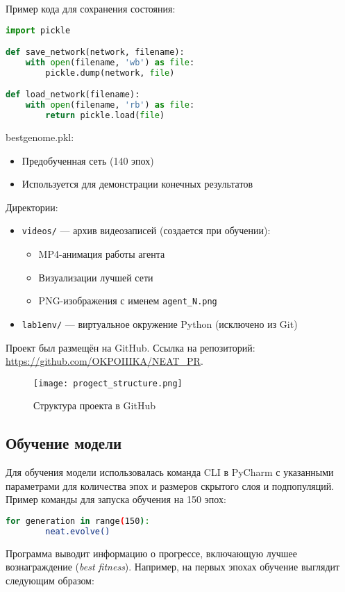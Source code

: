 \documentclass[a4paper,12pt]{article}
\begin{document}
Пример кода для сохранения состояния:

\begin{lstlisting}[language=Python]
import pickle

def save_network(network, filename):
    with open(filename, 'wb') as file:
        pickle.dump(network, file)

def load_network(filename):
    with open(filename, 'rb') as file:
        return pickle.load(file)
\end{lstlisting}	
	bestgenome.pkl:
	\begin{itemize}
		\item Предобученная сеть (140 эпох)
		\item Используется для демонстрации конечных результатов
	\end{itemize}
	
	Директории:
	\begin{itemize}
		\item \texttt{videos/} --- архив видеозаписей (создается при обучении):
		\begin{itemize}
			\item MP4-анимация работы агента

		\end{itemize}
		\begin{itemize}
			\item Визуализации лучшей сети
			\item PNG-изображения с именем \texttt{agent\_N.png}
		\end{itemize}
		\item \texttt{lab1env/} --- виртуальное окружение Python (исключено из Git)
	\end{itemize}

Проект был размещён на GitHub.   
Ссылка на репозиторий: \url{https://github.com/OKPOIIIKA/NEAT_PR}.

\begin{figure}[H]
	\centering
	\texttt{[image: progect\_structure.png]}
	\caption{Структура проекта в GitHub}
	\label{fig:project_structure}
\end{figure}

\subsection{Обучение модели}

Для обучения модели использовалась команда CLI в PyCharm с указанными параметрами для количества эпох и размеров скрытого слоя и подпопуляций. Пример команды для запуска обучения на 150 эпох:
\begin{lstlisting}[language=bash]
	for generation in range(150):  
        neat.evolve()
\end{lstlisting}
Программа выводит информацию о прогрессе, включающую лучшее вознаграждение (\textit{best fitness}). Например, на первых эпохах обучение выглядит следующим образом:
\end{document}
